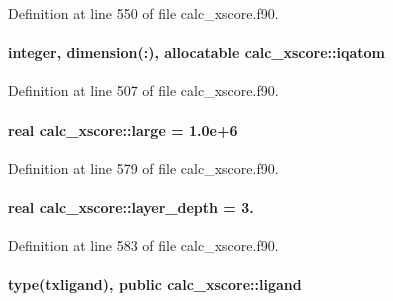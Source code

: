 Definition at line 550 of file calc\-\_\-xscore.\-f90.

\hypertarget{classcalc__xscore_a4da394dcce18b72644eda3244d49533d}{
\paragraph[{iqatom}]{\setlength{\rightskip}{0pt plus 5cm}integer, dimension(\-:), allocatable calc\-\_\-xscore\-::iqatom}}\label{classcalc__xscore_a4da394dcce18b72644eda3244d49533d}


Definition at line 507 of file calc\-\_\-xscore.\-f90.

\hypertarget{classcalc__xscore_aed23f3f4cf5a66da5996c92f0068b4bd}{
\paragraph[{large}]{\setlength{\rightskip}{0pt plus 5cm}real calc\-\_\-xscore\-::large = 1.\-0e+6}}\label{classcalc__xscore_aed23f3f4cf5a66da5996c92f0068b4bd}


Definition at line 579 of file calc\-\_\-xscore.\-f90.

\hypertarget{classcalc__xscore_acf719e7fa91a401a1c8044e68fbf9697}{
\paragraph[{layer\-\_\-depth}]{\setlength{\rightskip}{0pt plus 5cm}real calc\-\_\-xscore\-::layer\-\_\-depth = 3.}}\label{classcalc__xscore_acf719e7fa91a401a1c8044e68fbf9697}


Definition at line 583 of file calc\-\_\-xscore.\-f90.

\hypertarget{classcalc__xscore_ad2efc1238a463be4b83681419cd6b113}{
\paragraph[{ligand}]{\setlength{\rightskip}{0pt plus 5cm}type({\bf txligand}), public calc\-\_\-xscore\-::ligand}}\label{classcalc__xscore_ad2efc1238a463be4b83681419cd6b113}



